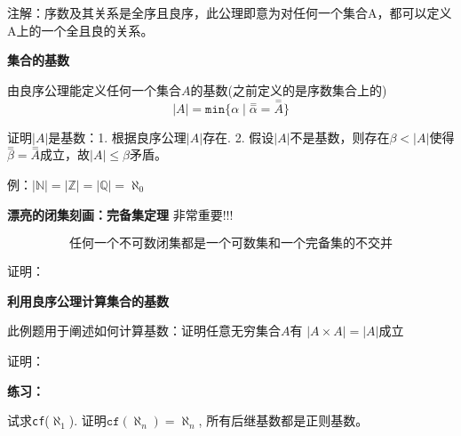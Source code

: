 \documentclass[UTF8, 9pt, a4paper]{ctexart}
\newcommand{\ksec}[2]{\noindent \textbf{\large #1} #2\par}
\begin{document}
	注解：序数及其关系是全序且良序，此公理即意为对任何一个集合A，都可以定义A上的一个全且良的关系。
	
	\ksec{集合的基数}{}
	
	由良序公理能定义任何一个集合$ A $的基数(之前定义的是序数集合上的)
	$$ |A| = \texttt{min}\{\alpha \mid \overset{=}{\alpha} = \overset{=}{A}\} $$
	
	证明$ |A| $是基数：1. 根据良序公理$ |A| $存在. 2. 假设$ |A| $不是基数，则存在$ \beta < |A| $使得$ \overset{=}{\beta} = \overset{=}{A} $成立，故$ |A| \leq \beta $矛盾。
	
	例：$ |\mathbb{N}| = |\mathbb{Z}| = |\mathbb{Q}| = \aleph_0$
	
	
	\ksec{漂亮的闭集刻画：完备集定理}{非常重要!!!}
		$$ \texttt{任何一个不可数闭集都是一个可数集和一个完备集的不交并} $$
	
	证明：

	\ksec{利用良序公理计算集合的基数}{}
	此例题用于阐述如何计算基数：证明任意无穷集合$ A $有 $ |A \times A| = |A| $成立
	
	证明：
	
	
	
	\pagebreak	
	
	\ksec{练习：}{}
	试求\texttt{cf}($ \aleph_1 $). 
	证明$ \texttt{cf}(\aleph_n) = \aleph_n $, 所有后继基数都是正则基数。
	
	
\end{document}
